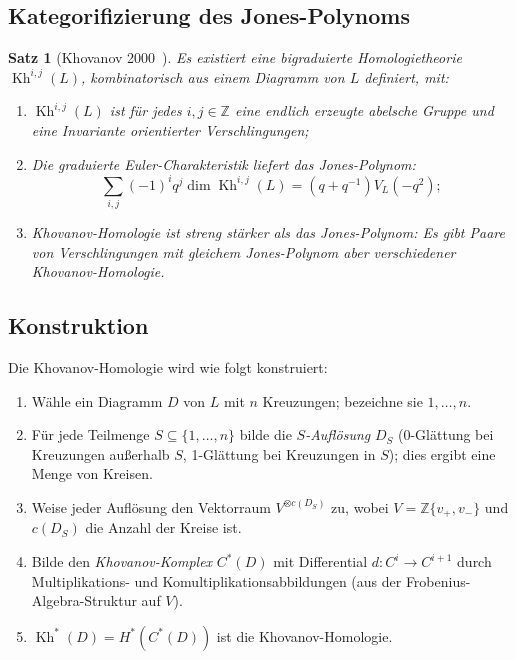 \documentclass[12pt,a4paper]{amsart}
\newtheorem{satz}[theorem]{Satz}
\theoremstyle{definition}
\theoremstyle{remark}
\newcommand{\Z}{\mathbb{Z}}
\DeclareMathOperator{\Kh}{Kh}
\begin{document}
\subsection{Kategorifizierung des Jones-Polynoms}

\begin{satz}[Khovanov 2000~\cite{Khovanov2000}]
\label{satz:Khovanov}
Es existiert eine bigraduierte Homologietheorie $\Kh^{i,j}(L)$,
kombinatorisch aus einem Diagramm von $L$ definiert, mit:
\begin{enumerate}[label=\roman*)]
\item $\Kh^{i,j}(L)$ ist für jedes $i,j \in \Z$ eine endlich erzeugte
      abelsche Gruppe und eine Invariante orientierter Verschlingungen;
\item Die graduierte Euler-Charakteristik liefert das Jones-Polynom:
      \[
          \sum_{i,j} (-1)^i q^j \dim \Kh^{i,j}(L)
          = (q + q^{-1}) V_L(-q^2);
      \]
\item Khovanov-Homologie ist streng stärker als das Jones-Polynom:
      Es gibt Paare von Verschlingungen mit gleichem Jones-Polynom
      aber verschiedener Khovanov-Homologie.
\end{enumerate}
\end{satz}

\subsection{Konstruktion}

Die Khovanov-Homologie wird wie folgt konstruiert:
\begin{enumerate}[label=\arabic*.]
\item Wähle ein Diagramm $D$ von $L$ mit $n$ Kreuzungen; bezeichne sie $1, \ldots, n$.
\item Für jede Teilmenge $S \subseteq \{1,\ldots,n\}$ bilde die \emph{$S$-Auflösung}
      $D_S$ (0-Glättung bei Kreuzungen außerhalb $S$, 1-Glättung bei Kreuzungen in $S$);
      dies ergibt eine Menge von Kreisen.
\item Weise jeder Auflösung den Vektorraum $V^{\otimes c(D_S)}$ zu,
      wobei $V = \Z\{v_+, v_-\}$ und $c(D_S)$ die Anzahl der Kreise ist.
\item Bilde den \emph{Khovanov-Komplex} $C^*(D)$ mit Differential
      $d \colon C^i \to C^{i+1}$ durch Multiplikations- und Komultiplikationsabbildungen
      (aus der Frobenius-Algebra-Struktur auf $V$).
\item $\Kh^*(D) = H^*(C^*(D))$ ist die Khovanov-Homologie.
\end{enumerate}
\end{document}
